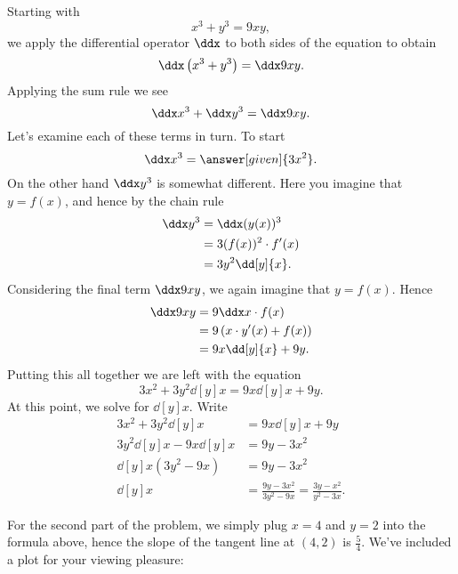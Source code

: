 \documentclass{ximera}
\begin{document}
\begin{example}
\begin{explanation}
Starting with 
\[
x^3+y^3 = 9xy,
\]
we apply the differential operator $\ddx$ to both sides of the
equation to obtain
\[
\ddx \left(x^3+y^3\right) = \ddx 9xy.
\]
Applying the sum rule we see
\[
\ddx x^3+\ddx y^3 = \ddx 9xy.
\]
Let's examine each of these terms in turn. To start
\[
\ddx x^3 = \answer[given]{3x^2}.
\]
On the other hand $\ddx y^3$ is somewhat different. Here you imagine that $y = f(x)$, and hence by the chain rule
\begin{align*}
\ddx y^3 &= \ddx (y(x))^3 \\ 
&= 3(f(x))^2 \cdot f'(x) \\
&= 3y^2\dd[y]{x}.\\
\end{align*}
Considering the final term $\ddx 9xy$, we again imagine that $y=f(x)$. Hence 
\begin{align*}
\ddx 9xy &= 9\ddx x\cdot f(x) \\
&= 9 \left(x\cdot y'(x) + f(x)\right)\\
&= 9x \dd[y]{x} + 9y.
\end{align*}
Putting this all together we are left with the equation
\[
3x^2 + 3y^2\dd[y]{x} =9x \dd[y]{x} + 9y.
\]
At this point, we solve for $\dd[y]{x}$. Write
\begin{align*}
3x^2 + 3y^2\dd[y]{x} &= 9x \dd[y]{x} + 9y\\
3y^2\dd[y]{x} -  9x \dd[y]{x} &= 9y - 3x^2\\
\dd[y]{x}\left(3y^2-9x\right)&= 9y - 3x^2\\
\dd[y]{x} &=\frac{9y - 3x^2}{3y^2-9x} = \frac{3y - x^2}{y^2-3x}.
\end{align*}

For the second part of the problem, we simply plug $x=4$ and $y=2$
into the formula above, hence the slope of the tangent line at $(4,2)$
is $\frac{5}{4}$. We've included a plot for your viewing pleasure:
\begin{image}
\end{image}
\end{explanation}
\end{example}
\end{document}

